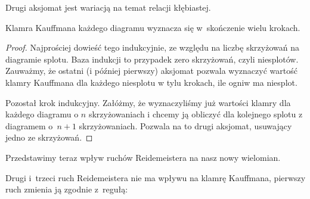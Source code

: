 Drugi aksjomat jest wariacją na temat relacji kłębiastej.

\begin{lemma}
    Klamra Kauffmana każdego diagramu wyznacza się w~skończenie wielu krokach.
\end{lemma}

\begin{proof}
    Najprościej dowieść tego indukcyjnie, ze względu na liczbę skrzyżowań na diagramie splotu.
    Baza indukcji to przypadek zero skrzyżowań, czyli niesplotów.
    Zauważmy, że ostatni (i później pierwszy) aksjomat pozwala wyznaczyć wartość klamry Kauffmana dla każdego niesplotu w tylu krokach, ile ogniw ma niesplot.

    Pozostał krok indukcyjny.
    Załóżmy, że wyznaczyliśmy już wartości klamry dla każdego diagramu o $n$ skrzyżowaniach i chcemy ją obliczyć dla kolejnego splotu z diagramem o~$n + 1$ skrzyżowaniach.
    Pozwala na to drugi aksjomat, usuwający jedno ze skrzyżowań.
\end{proof}

Przedstawimy teraz wpływ ruchów Reidemeistera na nasz nowy wielomian.

\begin{lemma}
    Drugi i~trzeci ruch Reidemeistera nie ma wpływu na klamrę Kauffmana,
    pierwszy ruch zmienia ją zgodnie z~regułą:
\begin{comment}
    \begin{equation}
        \bracket{\MediumReidemeisterOneLeft} = -A^{-3} \bracket{\,\MediumReidemeisterOneStraight\,}.
    \end{equation}
\end{comment}
\end{lemma}

